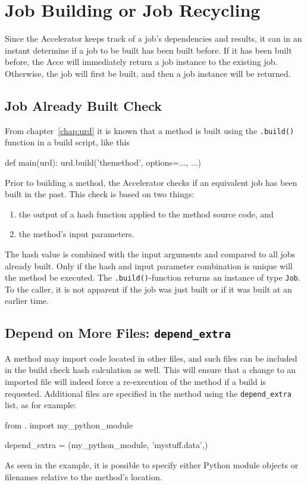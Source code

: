 \section{Job Building or Job Recycling}
Since the Accelerator keeps track of a job's dependencies and results,
it can in an instant determine if a job to be built has been built
before.  If it has been built before, the Acce will immediately return
a job instance to the existing job.  Otherwise, the job will first be
built, and then a job instance will be returned.


\subsection{Job Already Built Check}
From chapter~\ref{chap:urd} it is known that a method is built using
the \texttt{.build()} function in a build script, like this
\begin{python}
def main(urd):
    urd.build('themethod', options=..., ...)
\end{python}

Prior to building a method, the Accelerator checks if an equivalent
job has been built in the past.  This check is based on two things:
\begin{enumerate}
\item  the output of a hash function applied to the method source code, and
\item  the method's input parameters.
\end{enumerate}
The hash value is combined with the input arguments and compared to
all jobs already built.  Only if the hash and input parameter
combination is unique will the method be executed.  The
\texttt{.build()}-function returns an instance of type \texttt{Job}.
To the caller, it is not apparent if the job was just built or if it
was built at an earlier time.


\subsection{Depend on More Files:  \texttt{depend\_extra}}
A method may import code located in other files, and such files can be
included in the build check hash calculation as well.  This will
ensure that a change to an imported file will indeed force a
re-execution of the method if a build is requested.  Additional files
are specified in the method using the \texttt{depend\_extra} list, as
for example:
\begin{python}
from . import my_python_module

depend_extra = (my_python_module, 'mystuff.data',)
\end{python}
As seen in the example, it is possible to specify either Python module
objects or filenames relative to the method's location.

